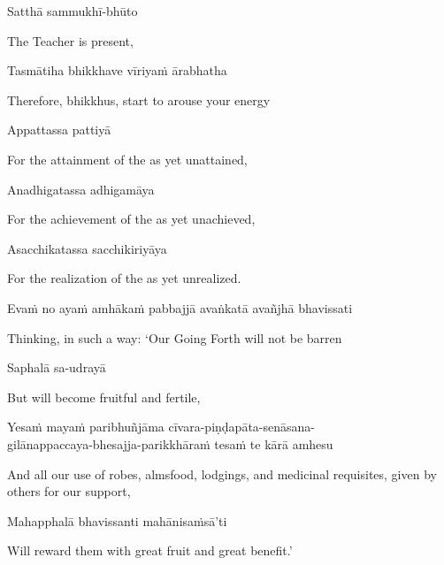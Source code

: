 Satthā sammukhī-bhūto

\begin{english}
  The Teacher is present,
\end{english}

Tasmātiha bhikkhave vīriyaṁ ārabhatha

\begin{english}
  Therefore, bhikkhus, start to arouse your energy
\end{english}

Appattassa pattiyā

\begin{english}
  For the attainment of the as yet unattained,
\end{english}

Anadhigatassa adhigamāya

\begin{english}
  For the achievement of the as yet unachieved,
\end{english}

Asacchikatassa sacchikiriyāya

\begin{english}
  For the realization of the as yet unrealized.
\end{english}

Evaṁ no ayaṁ amhākaṁ pabbajjā avaṅkatā avañjhā bhavissati

\begin{english}
  Thinking, in such a way: `Our Going Forth will not be barren
\end{english}

Saphalā sa-udrayā

\begin{english}
  But will become fruitful and fertile,
\end{english}

Yesaṁ mayaṁ paribhuñjāma cīvara-piṇḍapāta-senāsana-\\
gilānappaccaya-bhesajja-parikkhāraṁ tesaṁ te kārā amhesu

\begin{english}
  And all our use of robes, almsfood, lodgings, and medicinal
  requisites, given by others for our support,
\end{english}

Mahapphalā bhavissanti mahānisaṁsā'ti

\begin{english}
  Will reward them with great fruit and great benefit.'
\end{english}

